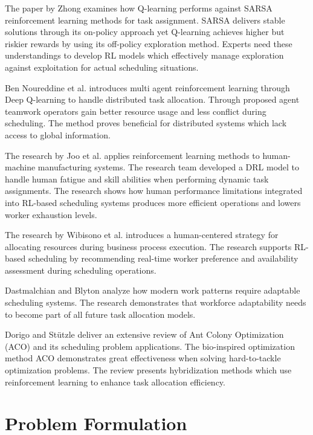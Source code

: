\documentclass[conference]{IEEEtran}
\begin{document}
	The paper by Zhong \cite{zhong2024} examines how Q-learning performs against SARSA
	reinforcement learning methods for task assignment. SARSA delivers stable
	solutions through its on-policy approach yet Q-learning achieves higher but
	riskier rewards by using its off-policy exploration method. Experts need these
	understandings to develop RL models which effectively manage exploration against
	exploitation for actual scheduling situations.

	Ben Noureddine et al. \cite{noureddine2017} introduces multi agent
	reinforcement learning through Deep Q-learning to handle distributed task
	allocation. Through proposed agent teamwork operators gain better resource usage
	and less conflict during scheduling. The method proves beneficial for
	distributed systems which lack access to global information.

	The research by Joo et al. \cite{joo2022} applies reinforcement learning methods
	to human-machine manufacturing systems. The research team developed a DRL
	model to handle human fatigue and skill abilities when performing dynamic task
	assignments. The research shows how human performance limitations integrated into
	RL-based scheduling systems produces more efficient operations and lowers worker
	exhaustion levels.

	The research by Wibisono et al. \cite{wibisono2016} introduces a human-centered
	strategy for allocating resources during business process execution. The research
	supports RL-based scheduling by recommending real-time worker preference and availability
	assessment during scheduling operations.

	Dastmalchian and Blyton \cite{dastmalchian2001} analyze how modern work patterns
	require adaptable scheduling systems. The research demonstrates that workforce
	adaptability needs to become part of all future task allocation models.

	Dorigo and Stützle \cite{dorigo2016} deliver an extensive review of Ant Colony
	Optimization (ACO) and its scheduling problem applications. The bio-inspired optimization
	method ACO demonstrates great effectiveness when solving hard-to-tackle optimization
	problems. The review presents hybridization methods which use reinforcement
	learning to enhance task allocation efficiency.

	\section{Problem Formulation}
\end{document}
